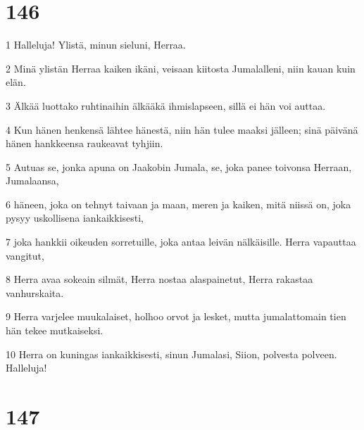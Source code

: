 \chapter{146}

\par 1 Halleluja! Ylistä, minun sieluni, Herraa.
\par 2 Minä ylistän Herraa kaiken ikäni, veisaan kiitosta Jumalalleni, niin kauan kuin elän.
\par 3 Älkää luottako ruhtinaihin älkääkä ihmislapseen, sillä ei hän voi auttaa.
\par 4 Kun hänen henkensä lähtee hänestä, niin hän tulee maaksi jälleen; sinä päivänä hänen hankkeensa raukeavat tyhjiin.
\par 5 Autuas se, jonka apuna on Jaakobin Jumala, se, joka panee toivonsa Herraan, Jumalaansa,
\par 6 häneen, joka on tehnyt taivaan ja maan, meren ja kaiken, mitä niissä on, joka pysyy uskollisena iankaikkisesti,
\par 7 joka hankkii oikeuden sorretuille, joka antaa leivän nälkäisille. Herra vapauttaa vangitut,
\par 8 Herra avaa sokeain silmät, Herra nostaa alaspainetut, Herra rakastaa vanhurskaita.
\par 9 Herra varjelee muukalaiset, holhoo orvot ja lesket, mutta jumalattomain tien hän tekee mutkaiseksi.
\par 10 Herra on kuningas iankaikkisesti, sinun Jumalasi, Siion, polvesta polveen. Halleluja!

\chapter{147}

